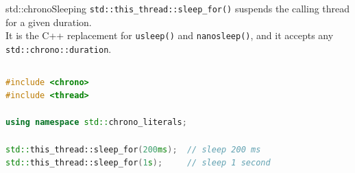 \begin{frame}[fragile]{std::chrono}{Sleeping}
	\justifying
	\texttt{std::this\_thread::sleep\_for()} suspends the calling thread for a given duration.\\
	It is the C++ replacement for \texttt{usleep()} and \texttt{nanosleep()}, and it accepts any\\
  \texttt{std::chrono::duration}.
  \medskip
	\begin{columns}
		\begin{lstlisting}[style=codebeamer, language=C++, caption=Sleeping with \texttt{chrono} durations.]
#include <chrono>
#include <thread>

using namespace std::chrono_literals;

std::this_thread::sleep_for(200ms);  // sleep 200 ms
std::this_thread::sleep_for(1s);     // sleep 1 second
    \end{lstlisting}
	\end{columns}
\end{frame}
